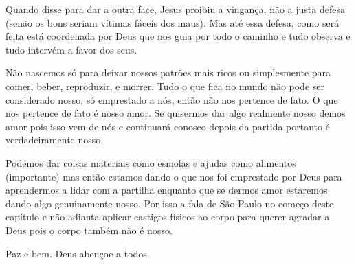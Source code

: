 \emdash{}Quando disse para dar a outra face, Jesus proibiu a vingança, não a justa defesa (senão os bons seriam vítimas fáceis dos maus). Mas até essa defesa, como será feita está coordenada por Deus que nos guia por todo o caminho e tudo observa e tudo intervém a favor dos seus.

\emdash{}Não nascemos só para deixar nossos patrões mais ricos ou simplesmente para comer, beber, reproduzir, e morrer. Tudo o que fica no mundo não pode ser considerado nosso, só emprestado a nós, então não nos pertence de fato. O que nos pertence de fato é nosso amor. Se quisermos dar algo realmente nosso demos amor pois isso vem de nós e continuará conosco depois da partida portanto é verdadeiramente nosso.

\emdash{}Podemos dar coisas materiais como esmolas e ajudas como alimentos (importante) mas então estamos dando o que nos foi emprestado por Deus para aprendermos a lidar com a partilha enquanto que se dermos amor estaremos dando algo genuinamente nosso. Por isso a fala de São Paulo no começo deste capítulo e não adianta aplicar castigos físicos ao corpo para querer agradar a Deus pois o corpo também não é nosso.

\emdash{}Paz e bem. Deus abençoe a todos.